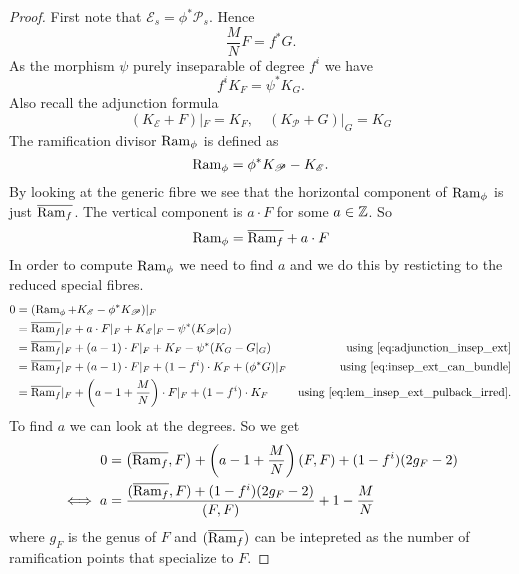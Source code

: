 \begin{proof}
	First note that $\mathscr{E} _s = \phi^* \mathscr{P} _s$. Hence 
	\begin{equation}\label{eq:lem_insep_ext_pulback_irred}
		\frac{M}{N} F = f^* G
	.\end{equation} 
	As the morphism $\psi$ purely inseparable of degree $f^{i}$ we have 
	\begin{equation}\label{eq:insep_ext_can_bundle}
		f^{i} K_F = \psi^* K_G
	.\end{equation}
	Also recall the adjunction formula 
	\begin{equation}\label{eq:adjunction_insep_ext}
		(K_\mathscr E + F)|_F = K_F, \quad (K_\mathscr P + G)|_ G = K_G 
	\end{equation}
	The ramification divisor $\operatorname{Ram}_\phi$ is defined as \[
		\operatorname{Ram}_\phi= \phi^* K_\mathscr P - K_\mathscr E
	.\] 
	By looking at the generic fibre we see that the horizontal component of $\operatorname{Ram} _\phi$ is just $\overline{\operatorname{Ram}_f}$. 
	The vertical component is $a\cdot F$ for some $a \in \mathbb{Z}$. 
	So 
	\begin{equation}
		\operatorname{Ram}_\phi = \overline{\operatorname{Ram}_f} + a \cdot F
	\end{equation}
	In order to compute $\operatorname{Ram}_\phi$ we need to find $a$ and we do this by resticting to the reduced special fibres. 
	\begin{align*}
		0 &= (\operatorname{Ram}_\phi + K_\mathscr E - \phi^* K_{\mathscr P})|_F\\
		  &= \overline{\operatorname{Ram}_f}|_F + a\cdot F|_F + K_\mathscr E|_F - \psi^*(K_\mathscr P|_G) \\
		  &= \overline{\operatorname{Ram}_f}|_F + (a-1) \cdot F|_F + K_F - \psi^*(K_G - G|_G) & \text{using \eqref{eq:adjunction_insep_ext}}\\
		  &= \overline{\operatorname{Ram} _f}|_F + (a - 1)\cdot F|_F + (1-f^{i})\cdot K_F + (\phi^* G)|_F & \text{using \eqref{eq:insep_ext_can_bundle}} \\
		  &= \overline{\operatorname{Ram}_f}|_F + \left(a-1 + \frac{M}{N}\right) \cdot F|_F + (1 - f^{i}) \cdot K_F  & \text{using \eqref{eq:lem_insep_ext_pulback_irred}}
	.\end{align*}
	To find $a$ we can look at the degrees. 
	So we get 
	\begin{align*}
		0 &= \left( \overline{\operatorname{Ram}_f}, F \right) + \left(a - 1 + \frac{M}{N}\right) \left(F, F\right) + (1-f^{i}) (2g_F -2) \\
		\iff a &= \frac{(\overline{\operatorname{Ram}_f}, F) + (1-f^{i})(2g_F -2)  }{(F, F)} + 1 - \frac{M}{N}
	\end{align*}
	where $g_F$ is the genus of $F$ and $(\overline{\operatorname{Ram}_f})$ can be intepreted as the number of ramification points that specialize to $F$. 



\end{proof}
